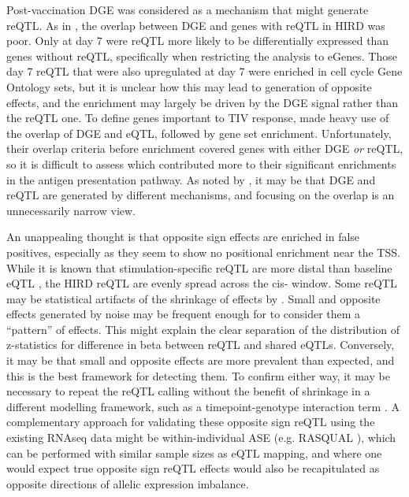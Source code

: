 Post-vaccination \gls{DGE} was considered as a mechanism that might generate \gls{reQTL}.
As in \textcite{kim-hellmuth2017GeneticRegulatoryEffects, davenport2018DiscoveringVivoCytokineeQTL}, the overlap between \gls{DGE} and genes with reQTL in \gls{HIRD} was poor.
Only at day 7 were \gls{reQTL} more likely to be differentially expressed than genes without reQTL, specifically when restricting the analysis to eGenes.
Those day 7 \gls{reQTL} that were also upregulated at day 7 were enriched in cell cycle Gene Ontology sets, but it is unclear how this may lead to generation of opposite effects, and the enrichment may largely be driven by the \gls{DGE} signal rather than the \gls{reQTL} one.
To define genes important to \gls{TIV} response,
\textcite{franco2013IntegrativeGenomicAnalysis} made heavy use of the overlap of \gls{DGE} and \gls{eQTL}, followed by gene set enrichment.
Unfortunately, their overlap criteria before enrichment covered genes with either \gls{DGE} \emph{or} \gls{reQTL}, so it is difficult to assess 
which contributed more to their significant enrichments in the antigen presentation pathway.
As noted by \textcite{davenport2018DiscoveringVivoCytokineeQTL}, 
it may be that \gls{DGE} and \gls{reQTL} are generated by different mechanisms, and focusing on the overlap is an unnecessarily narrow view. 

An unappealing thought is that opposite sign effects are enriched in false positives, especially as they seem to show no positional enrichment near the \gls{TSS}.
While it is known that stimulation-specific \gls{reQTL} are more distal than baseline eQTL \autocite{fairfax2014InnateImmuneActivity}, the \gls{HIRD} reQTL are evenly spread across the cis- window.
Some reQTL may be statistical artifacts of the shrinkage of effects by .
Small and opposite effects generated by noise may be frequent enough for  to consider them a \enquote{pattern} of effects.
This might explain the clear separation of the distribution of z-statistics for difference in beta between \gls{reQTL} and shared eQTLs.
Conversely, it may be that small and opposite effects are more prevalent than expected, and this is the best framework for detecting them.
To confirm either way, it may be necessary to repeat the \gls{reQTL} calling without the benefit of  shrinkage in a different modelling framework,
such as a timepoint-genotype interaction term \autocite{davenport2018DiscoveringVivoCytokineeQTL}.
A complementary approach for validating these opposite sign \gls{reQTL} using the existing \gls{RNAseq} data might be within-individual \gls{ASE} (e.g. RASQUAL \autocite{kumasaka2016FinemappingCellularQTLs}),
which can be performed with similar sample sizes as \gls{eQTL} mapping,
and where one would expect true opposite sign \gls{reQTL} effects would also be recapitulated as opposite directions of allelic expression imbalance.

